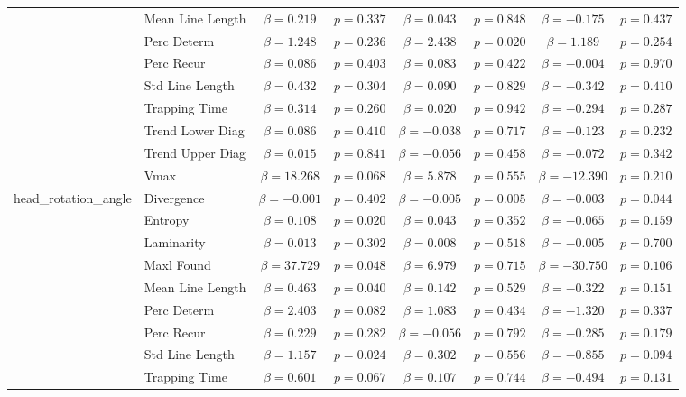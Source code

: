 \begin{tabular}{llcc|cc|cc}
 & Mean Line Length & $\beta = 0.219$ & $p = 0.337$ & $\beta = 0.043$ & $p = 0.848$ & $\beta = -0.175$ & $p = 0.437$ \\
 & Perc Determ & $\beta = 1.248$ & $p = 0.236$ & $\beta = 2.438$ & $p = 0.020$ & $\beta = 1.189$ & $p = 0.254$ \\
 & Perc Recur & $\beta = 0.086$ & $p = 0.403$ & $\beta = 0.083$ & $p = 0.422$ & $\beta = -0.004$ & $p = 0.970$ \\
 & Std Line Length & $\beta = 0.432$ & $p = 0.304$ & $\beta = 0.090$ & $p = 0.829$ & $\beta = -0.342$ & $p = 0.410$ \\
 & Trapping Time & $\beta = 0.314$ & $p = 0.260$ & $\beta = 0.020$ & $p = 0.942$ & $\beta = -0.294$ & $p = 0.287$ \\
 & Trend Lower Diag & $\beta = 0.086$ & $p = 0.410$ & $\beta = -0.038$ & $p = 0.717$ & $\beta = -0.123$ & $p = 0.232$ \\
 & Trend Upper Diag & $\beta = 0.015$ & $p = 0.841$ & $\beta = -0.056$ & $p = 0.458$ & $\beta = -0.072$ & $p = 0.342$ \\
 & Vmax & $\beta = 18.268$ & $p = 0.068$ & $\beta = 5.878$ & $p = 0.555$ & $\beta = -12.390$ & $p = 0.210$ \\
\midrule
\multirow{12}{*}{head_rotation_angle} & Divergence & $\beta = -0.001$ & $p = 0.402$ & $\beta = -0.005$ & $p = 0.005$ & $\beta = -0.003$ & $p = 0.044$ \\
 & Entropy & $\beta = 0.108$ & $p = 0.020$ & $\beta = 0.043$ & $p = 0.352$ & $\beta = -0.065$ & $p = 0.159$ \\
 & Laminarity & $\beta = 0.013$ & $p = 0.302$ & $\beta = 0.008$ & $p = 0.518$ & $\beta = -0.005$ & $p = 0.700$ \\
 & Maxl Found & $\beta = 37.729$ & $p = 0.048$ & $\beta = 6.979$ & $p = 0.715$ & $\beta = -30.750$ & $p = 0.106$ \\
 & Mean Line Length & $\beta = 0.463$ & $p = 0.040$ & $\beta = 0.142$ & $p = 0.529$ & $\beta = -0.322$ & $p = 0.151$ \\
 & Perc Determ & $\beta = 2.403$ & $p = 0.082$ & $\beta = 1.083$ & $p = 0.434$ & $\beta = -1.320$ & $p = 0.337$ \\
 & Perc Recur & $\beta = 0.229$ & $p = 0.282$ & $\beta = -0.056$ & $p = 0.792$ & $\beta = -0.285$ & $p = 0.179$ \\
 & Std Line Length & $\beta = 1.157$ & $p = 0.024$ & $\beta = 0.302$ & $p = 0.556$ & $\beta = -0.855$ & $p = 0.094$ \\
 & Trapping Time & $\beta = 0.601$ & $p = 0.067$ & $\beta = 0.107$ & $p = 0.744$ & $\beta = -0.494$ & $p = 0.131$ \\

\end{tabular}
